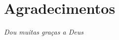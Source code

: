 \cleardoublepage
\thispagestyle{empty}


\chapter*{Agradecimentos}

\vfill


{\normalsize \it \hfill Dou muitas graças a Deus \vspace*{4pt}}


~\\

\begin{comment}
{\normalsize \it Dou muitas graças a Estevam Lawrence por me 
ajudar a resolver muitas duvidas sobre definições e uso de termos na teoria musical.
\vspace*{4pt}}
\end{comment}

\begin{comment}
{\normalsize \it Dou muitas graças ao Prof. José Henrique de Souza (Henrique Carioca)
por suas aulas de samba no pê, 
e ter-me ensinado exercícios para o desenvolvimento da consciência corporal.
\vspace*{4pt}}
\end{comment}

\begin{comment}
{\normalsize \it Dou muitas graças ao Prof. Jaime Arôxa por me 
ajudar a resolver algumas duvidas sobre definições e uso de termos na pedagogia para o ensino do samba de gafieira.
\vspace*{4pt}}
\end{comment}

\begin{comment}
{\normalsize \it Dou muitas graças a \textcolor{red}{XXXXXXXXXXX} pela 
suas sugestões e revisão  do capitulo \textcolor{red}{XXXXXXXXXXX}.
\vspace*{4pt}}
\end{comment}


